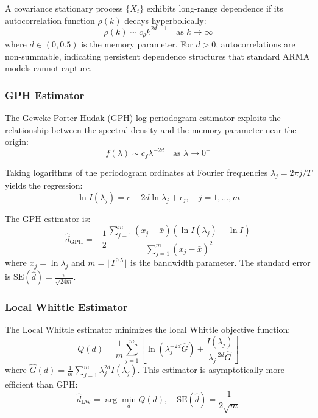 \documentclass[12pt,a4paper]{article}
\begin{document}
A covariance stationary process $\{X_t\}$ exhibits long-range dependence if its autocorrelation function $\rho(k)$ decays hyperbolically:
\begin{equation}
    \rho(k) \sim c_\rho k^{2d-1} \quad \text{as } k \to \infty
\end{equation}
where $d \in (0, 0.5)$ is the memory parameter. For $d > 0$, autocorrelations are non-summable, indicating persistent dependence structures that standard ARMA models cannot capture.

\subsubsection{GPH Estimator}

The Geweke-Porter-Hudak (GPH) log-periodogram estimator \citep{geweke1983estimation} exploits the relationship between the spectral density and the memory parameter near the origin:
\begin{equation}
    f(\lambda) \sim c_f \lambda^{-2d} \quad \text{as } \lambda \to 0^+
\end{equation}

Taking logarithms of the periodogram ordinates at Fourier frequencies $\lambda_j = 2\pi j/T$ yields the regression:
\begin{equation}
    \ln I(\lambda_j) = c - 2d \ln \lambda_j + \epsilon_j, \quad j = 1, \ldots, m
\end{equation}

The GPH estimator is:
\begin{equation}
    \hat{d}_{\text{GPH}} = -\frac{1}{2} \frac{\sum_{j=1}^m (x_j - \bar{x})(\ln I(\lambda_j) - \overline{\ln I})}{\sum_{j=1}^m (x_j - \bar{x})^2}
\end{equation}
where $x_j = \ln \lambda_j$ and $m = \lfloor T^{0.5} \rfloor$ is the bandwidth parameter. The standard error is $\text{SE}(\hat{d}) = \frac{\pi}{\sqrt{24m}}$.

\subsubsection{Local Whittle Estimator}

The Local Whittle estimator \citep{robinson1995gaussian} minimizes the local Whittle objective function:
\begin{equation}
    Q(d) = \frac{1}{m}\sum_{j=1}^m \left[\ln(\lambda_j^{-2d} \hat{G}) + \frac{I(\lambda_j)}{\lambda_j^{-2d}\hat{G}}\right]
\end{equation}
where $\hat{G}(d) = \frac{1}{m}\sum_{j=1}^m \lambda_j^{2d} I(\lambda_j)$. This estimator is asymptotically more efficient than GPH:
\begin{equation}
    \hat{d}_{\text{LW}} = \arg\min_d Q(d), \quad \text{SE}(\hat{d}) = \frac{1}{2\sqrt{m}}
\end{equation}
\end{document}
